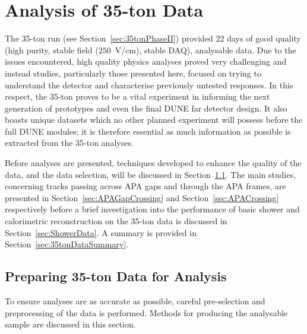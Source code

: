 
\graphicspath{{35tonAnalysis/Figs/}}

\chapter{Analysis of 35-ton Data}\label{chap:35tonAnalysis}

The 35-ton run (see Section~\ref{sec:35tonPhaseII}) provided 22 days of good quality (high purity, stable field ($250$~V/cm), stable DAQ), analysable data.  Due to the issues encountered, high quality physics analyses proved very challenging and instead studies, particularly those presented here, focused on trying to understand the detector and characterise previously untested responses.  In this respect, the 35-ton proves to be a vital experiment in informing the next generation of prototypes and even the final DUNE far detector design.  It also boasts unique datasets which no other planned experiment will possess before the full DUNE modules; it is therefore essential as much information as possible is extracted from the 35-ton analyses.

Before analyses are presented, techniques developed to enhance the quality of the data, and the data selection, will be discussed in Section~\ref{sec:Preparing35tonData}.  The main studies, concerning tracks passing across APA gaps and through the APA frames, are presented in Section~\ref{sec:APAGapCrossing} and Section~\ref{sec:APACrossing} respectively before a brief investigation into the performance of basic shower and calorimetric reconstruction on the 35-ton data is discussed in Section~\ref{sec:ShowerData}.  A summary is provided in Section~\ref{sec:35tonDataSummary}.

\section{Preparing 35-ton Data for Analysis}\label{sec:Preparing35tonData}

To ensure analyses are as accurate as possible, careful pre-selection and preprocessing of the data is performed.  Methods for producing the analysable sample are discussed in this section.

